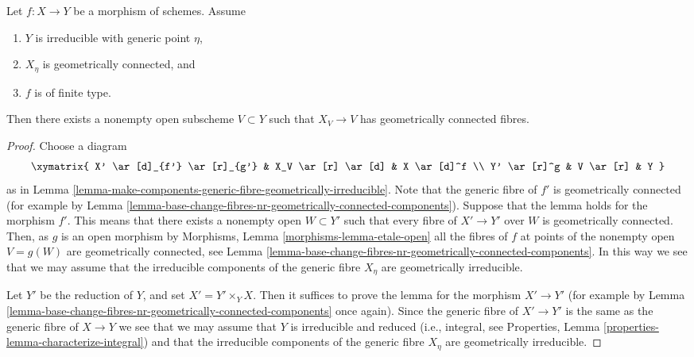 \begin{lemma}
\label{lemma-geometrically-connected-generic-fibre}
Let $f : X \to Y$ be a morphism of schemes.
Assume
\begin{enumerate}
\item $Y$ is irreducible with generic point $\eta$,
\item $X_\eta$ is geometrically connected, and
\item $f$ is of finite type.
\end{enumerate}
Then there exists a nonempty open subscheme $V \subset Y$
such that $X_V \to V$ has geometrically connected fibres.
\end{lemma}

\begin{proof}
Choose a diagram
$$
\xymatrix{
X' \ar[d]_{f'} \ar[r]_{g'} & X_V \ar[r] \ar[d] & X \ar[d]^f \\
Y' \ar[r]^g & V \ar[r] & Y
}
$$
as in
Lemma \ref{lemma-make-components-generic-fibre-geometrically-irreducible}.
Note that the generic fibre of $f'$ is geometrically connected
(for example by
Lemma \ref{lemma-base-change-fibres-nr-geometrically-connected-components}).
Suppose that the lemma holds for the morphism $f'$. This means that
there exists a nonempty open $W \subset Y'$ such that every fibre of
$X' \to Y'$ over $W$ is geometrically connected.
Then, as $g$ is an open morphism by
Morphisms, Lemma \ref{morphisms-lemma-etale-open}
all the fibres of $f$ at points of the nonempty open $V = g(W)$ are
geometrically connected, see
Lemma \ref{lemma-base-change-fibres-nr-geometrically-connected-components}.
In this way we see that we may assume that the irreducible
components of the generic fibre $X_\eta$ are geometrically irreducible.

\medskip\noindent
Let $Y'$ be the reduction of $Y$, and set $X' = Y' \times_Y X$.
Then it suffices to prove the lemma for the morphism $X' \to Y'$
(for example by
Lemma \ref{lemma-base-change-fibres-nr-geometrically-connected-components}
once again). Since the generic fibre of $X' \to Y'$ is the same as the
generic fibre of $X \to Y$ we see that we may assume that $Y$ is
irreducible and reduced (i.e., integral, see
Properties, Lemma \ref{properties-lemma-characterize-integral})
and that the irreducible
components of the generic fibre $X_\eta$ are geometrically irreducible.


\end{proof}
